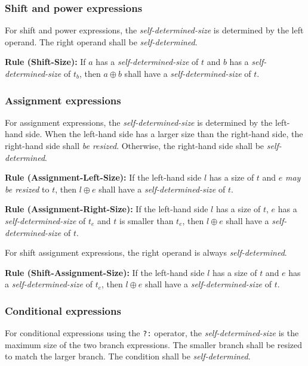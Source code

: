 \documentclass{article}
\newcommand{\sds}{\emph{self-determined-size}}
\newcommand{\mbr}{\emph{may be resized}}
\newenvironment{typingrule}[1]%
{\par\noindent\textbf{Rule (#1):} }%
{\par}
\begin{document}
\subsubsection{Shift and power expressions}%

For shift and power expressions, the \sds{} is determined
by the left operand. The right operand shall be \emph{self-determined}.

\begin{typingrule}{Shift-Size}
  If $a$ has a \sds{} of $t$ and $b$ has a
  \sds{} of $t_{b}$, then $a \oplus b$ shall have a
  \sds{} of $t$.
\end{typingrule}

\subsubsection{Assignment expressions}%

For assignment expressions, the \sds{} is determined by the
left-hand side. When the left-hand side has a larger size than the right-hand
side, the right-hand side shall \emph{be resized}. Otherwise, the right-hand
side shall be \emph{self-determined}.

\begin{typingrule}{Assignment-Left-Size}
  If the left-hand side $l$ has a size of $t$ and $e$ \mbr{} to
  $t$, then $l \oplus e$ shall have a \sds{} of $t$.
\end{typingrule}

\begin{typingrule}{Assignment-Right-Size}
  If the left-hand side $l$ has a size of $t$, $e$ has a
  \sds{} of $t_{e}$ and $t$ is smaller than $t_{e}$, then
  $l \oplus e$ shall have a \sds{} of $t$.
\end{typingrule}

For shift assignment expressions, the right operand is always
\emph{self-determined}.

\begin{typingrule}{Shift-Assignment-Size}
  If the left-hand side $l$ has a size of $t$ and $e$ has a
  \sds{} of $t_{e}$, then $l \oplus e$ shall have a
  \sds{} of $t$.
\end{typingrule}

\subsubsection{Conditional expressions}%

For conditional expressions using the \texttt{?:} operator, the
\sds{} is the maximum size of the two branch expressions.
The smaller branch shall be resized to match the larger branch. The condition
shall be \emph{self-determined}.
\end{document}
